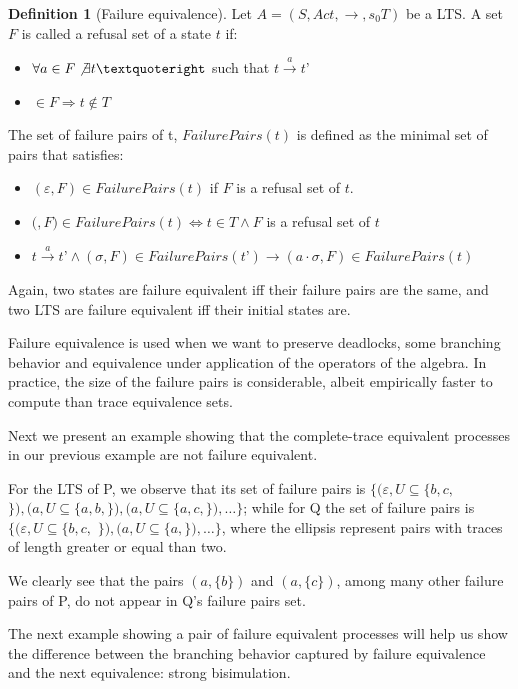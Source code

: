 \documentclass[11pt]{article}
\theoremstyle{definition}
\newtheorem{definition}{Definition}
\newcommand{\cmark}{\ding{51}}
\theoremstyle{plain}
\theoremstyle{definition}
\begin{document}
\begin{definition} [Failure equivalence]
	Let $ A = (S, Act, \rightarrow, s_0 T) $ be a LTS. A set $ F $ is called a refusal set of a state $ t $ if:
	\begin{itemize}
		\item $ \forall a \in F \not \exists t’ $ such that $ t\xrightarrow{a}t’ $
		\item \cmark $ \in F \Rightarrow t \not \in T$
	\end{itemize}
	The set of failure pairs of t, $ FailurePairs(t) $ is defined as the minimal set of pairs that satisfies:
	\begin{itemize}
		\item $ (\varepsilon, F) \in FailurePairs(t) $ if $ F $ is a refusal set of $ t $.
		\item $($\cmark$, F) \in FailurePairs(t) \iff t \in T \wedge F $ is a refusal set of $ t $
		\item $t\xrightarrow{a}t’ \wedge (\sigma, F) \in FailurePairs(t’) \rightarrow (a\cdot\sigma, F) \in FailurePairs(t)$
	\end{itemize}
\end{definition} 
Again, two states are failure equivalent iff their failure pairs are the same, and two LTS are failure equivalent iff their initial states are.

Failure equivalence is used when we want to preserve deadlocks, some branching behavior and equivalence under application of the operators of the algebra. In practice, the size of the failure pairs is considerable, albeit empirically faster to compute than trace equivalence sets. \cite{valmari1995failure}

Next we present an example showing that the complete-trace equivalent processes in our previous example are not failure equivalent.

For the LTS of P, we observe that its set of failure pairs is $ \{(\varepsilon,U\subseteq\{b,c,$ \cmark $\}), (a,U\subseteq\{a,b,$\cmark$\}), (a,U\subseteq\{a,c,$\cmark$\}), \dots\} $; while for Q the set of failure pairs is $ \{(\varepsilon,U\subseteq\{b,c,$ \cmark $\}), (a,U\subseteq\{a,$\cmark$\}), \dots\} $, where the ellipsis represent pairs with traces of length greater or equal than two.

We clearly see that the pairs $ (a,\{b\}) $ and $ (a,\{c\}) $, among many other failure pairs of P, do not appear in Q's failure pairs set.

The next example showing a pair of failure equivalent processes will help us show the difference between the branching behavior captured by failure equivalence and the next equivalence: strong bisimulation.
\end{document}
